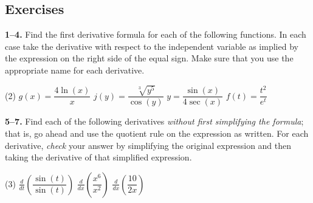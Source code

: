 \documentclass[10pt,oneside,]{book}
\theoremstyle{plain}
\theoremstyle{definition}
\numberwithin{equation}{section}
\newcommand{\fe}[2]{#1\mathopen{}\left(#2\right)\mathclose{}}
\newcommand{\lzoo}[2]{{\frac{d}{d#1}}{\left(#2\right)}}
\begin{document}
\subsection[Exercises]{Exercises}\label{exercises-38}
\textbf{1--4. }\hypertarget{exercisegroup-78}{\null}Find the first derivative formula for each of the following functions.  In each case take the derivative with respect to the independent variable as implied by the expression on the right side of the equal sign.  Make sure that you use the appropriate name for each derivative.%
\par
\begin{exercisegroup}(2)
\exercise[1.]\hypertarget{exercise-379}{\null}\(\fe{g}{x}=\dfrac{4\fe{\ln}{x}}{x}\)%
\exercise[2.]\hypertarget{exercise-380}{\null}\(\fe{j}{y}=\dfrac{\sqrt[3]{y^5}}{\fe{\cos}{y}}\)%
\exercise[3.]\hypertarget{exercise-381}{\null}\(y=\dfrac{\fe{\sin}{x}}{4\fe{\sec}{x}}\)%
\exercise[4.]\hypertarget{exercise-382}{\null}\(\fe{f}{t}=\dfrac{t^2}{e^t}\)%
\end{exercisegroup}
\par\smallskip\noindent
\textbf{5--7. }\hypertarget{exercisegroup-unsimplified-quotient}{\null}Find each of the following derivatives \emph{without first simplifying the formula}; that is, go ahead and use the quotient rule on the expression as written. For each derivative, \emph{check} your answer by simplifying the original expression and then taking the derivative of that simplified expression.%
\par
\begin{exercisegroup}(3)
\exercise[5.]\hypertarget{unsimplified-quotient-first}{\null}\(\lzoo{t}{\dfrac{\fe{\sin}{t}}{\fe{\sin}{t}}}\)%
\exercise[6.]\hypertarget{exercise-384}{\null}\(\lzoo{x}{\dfrac{x^6}{x^2}}\)%
\exercise[7.]\hypertarget{unsimplified-quotient-last}{\null}\(\lzoo{x}{\dfrac{10}{2x}}\)%
\end{exercisegroup}
\par\smallskip\noindent
\typeout{************************************************}
\typeout{************************************************}
\end{document}
